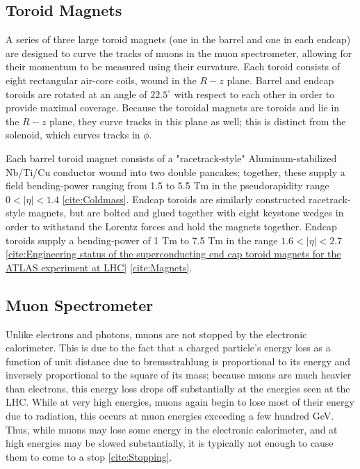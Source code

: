 \subsection{Toroid Magnets} \label{sec:toroids}

A series of three large toroid magnets (one in the barrel and one in each endcap) are designed to curve the tracks of muons in the muon spectrometer, allowing for their momentum to be measured using their curvature. Each toroid consists of eight rectangular air-core coils, wound in the $R - z$ plane. Barrel and endcap toroids are rotated at an angle of $22.5 ^{\circ}$ with respect to each other in order to provide maximal coverage. Because the toroidal magnets are toroids and lie in the $R - z$ plane, they curve tracks in this plane as well; this is distinct from the solenoid, which curves tracks in $\phi$.

Each barrel toroid magnet consists of a "racetrack-style" Aluminum-stabilized Nb/Ti/Cu conductor wound into two double pancakes; together, these supply a field bending-power ranging from 1.5 to 5.5 Tm  in the pseudorapidity range  $0 < |\eta | < 1.4$ \ref{cite:Coldmass}. Endcap toroids are similarly constructed racetrack-style magnets, but are bolted and glued together with eight keystone wedges in order to withstand the Lorentz forces and hold the magnets together. Endcap toroids supply a bending-power of 1 Tm to 7.5 Tm in the range $ 1.6 < |\eta | < 2.7 $ \ref{cite:Engineering status of the superconducting end cap toroid magnets for the ATLAS experiment at LHC} \ref{cite:Magnets}.

\subsection{Muon Spectrometer} \label{sec:Musyst}
 
Unlike electrons and photons, muons are not stopped by the electronic calorimeter. This is due to the fact that a charged particle's energy loss as a function of unit distance due to bremsstrahlung is proportional to its energy and inversely proportional to the square of its mass; because muons are much heavier than electrons, this energy loss drops off substantially at the energies seen at the LHC. While at very high energies, muons again begin to lose most of their energy due to radiation, this occurs at muon energies exceeding a few hundred GeV. Thus, while muons may lose some energy in the electronic calorimeter, and at high energies may be slowed substantially, it is typically not enough to cause them to come to a stop \ref{cite:Stopping}. 

